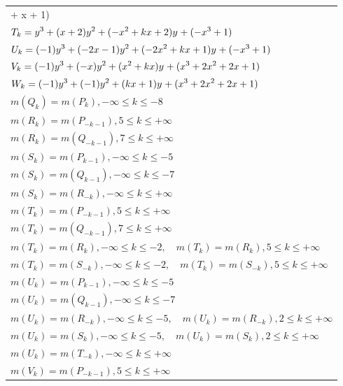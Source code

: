 \documentclass{amsart}
\begin{document}
\begin{longtable}{|l|}
 + x
 + 1)\)\\
\(\displaystyle T_k=y^{3}+(x
 + 2)y^{2}+(-x^2
 + k\*x
 + 2)y^{}+(-x^3
 + 1)\)\\
\(\displaystyle U_k=(-1)y^{3}+(-2\*x
 - 1)y^{2}+(-2\*x^2
 + k\*x
 + 1)y^{}+(-x^3
 + 1)\)\\
\(\displaystyle V_k=(-1)y^{3}+(-x)y^{2}+(x^2
 + k\*x)y^{}+(x^3
 + 2\*x^2
 + 2\*x
 + 1)\)\\
\(\displaystyle W_k=(-1)y^{3}+(-1)y^{2}+(k\*x
 + 1)y^{}+(x^3
 + 2\*x^2
 + 2\*x
 + 1)\)\\
\(\displaystyle m(Q_k) = m(P_{k}),-\infty \leqslant k \leqslant -8\)\\
\(\displaystyle m(R_k) = m(P_{-k
 - 1}),5 \leqslant k \leqslant +\infty\)\\
\(\displaystyle m(R_k) = m(Q_{-k
 - 1}),7 \leqslant k \leqslant +\infty\)\\
\(\displaystyle m(S_k) = m(P_{k
 - 1}),-\infty \leqslant k \leqslant -5\)\\
\(\displaystyle m(S_k) = m(Q_{k
 - 1}),-\infty \leqslant k \leqslant -7\)\\
\(\displaystyle m(S_k) = m(R_{-k}),-\infty \leqslant k \leqslant +\infty\)\\
\(\displaystyle m(T_k) = m(P_{-k
 - 1}),5 \leqslant k \leqslant +\infty\)\\
\(\displaystyle m(T_k) = m(Q_{-k
 - 1}),7 \leqslant k \leqslant +\infty\)\\
\(\displaystyle m(T_k) = m(R_{k}),-\infty \leqslant k \leqslant -2,\quad m(T_k) = m(R_{k}),5 \leqslant k \leqslant +\infty\)\\
\(\displaystyle m(T_k) = m(S_{-k}),-\infty \leqslant k \leqslant -2,\quad m(T_k) = m(S_{-k}),5 \leqslant k \leqslant +\infty\)\\
\(\displaystyle m(U_k) = m(P_{k
 - 1}),-\infty \leqslant k \leqslant -5\)\\
\(\displaystyle m(U_k) = m(Q_{k
 - 1}),-\infty \leqslant k \leqslant -7\)\\
\(\displaystyle m(U_k) = m(R_{-k}),-\infty \leqslant k \leqslant -5,\quad m(U_k) = m(R_{-k}),2 \leqslant k \leqslant +\infty\)\\
\(\displaystyle m(U_k) = m(S_{k}),-\infty \leqslant k \leqslant -5,\quad m(U_k) = m(S_{k}),2 \leqslant k \leqslant +\infty\)\\
\(\displaystyle m(U_k) = m(T_{-k}),-\infty \leqslant k \leqslant +\infty\)\\
\(\displaystyle m(V_k) = m(P_{-k
 - 1}),5 \leqslant k \leqslant +\infty\)\\

\end{longtable}
\end{document}
